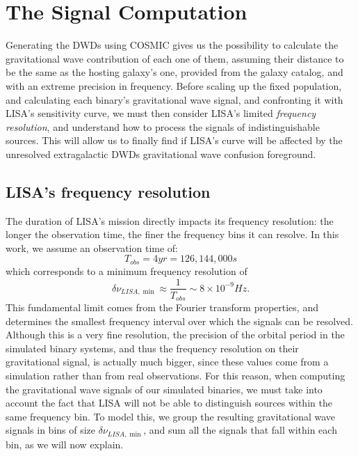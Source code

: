 \section{The Signal Computation}
Generating the DWDs using COSMIC gives us the possibility to calculate the gravitational wave contribution of each one of them, assuming their distance to be the same as the hosting galaxy's one, provided from the galaxy catalog, and with an extreme precision in frequency.
Before scaling up the fixed population, and calculating each binary's gravitational wave signal, and confronting it with LISA's sensitivity curve, we must then consider LISA's limited \textit{frequency resolution}, and understand how to process the signals of indistinguishable sources.
This will allow us to finally find if LISA's curve will be affected by the unresolved extragalactic DWDs gravitational wave confusion foreground.

\subsection{LISA's frequency resolution}
The duration of LISA’s mission directly impacts its frequency resolution: the longer the observation time, the finer the frequency bins it can resolve.
In this work, we assume an observation time of: 
\[
    T_{obs}=4yr=126,144,000s
\]
which corresponds to a minimum frequency resolution of
\begin{equation}
    \delta\nu_{LISA,\min}\approx \frac{1}{T_{obs}}\sim 8\times 10^{-9}Hz.
    \label{eq: LISA frequency resolution}
\end{equation}
This fundamental limit comes from the Fourier transform properties, and determines the smallest frequency interval over which the signals can be resolved.
Although this is a very fine resolution, the precision of the orbital period in the simulated binary systems, and thus the frequency resolution on their gravitational signal, is actually much bigger, since these values come from a simulation rather than from real observations.
For this reason, when computing the gravitational wave signals of our simulated binaries, we must take into account the fact that LISA will not be able to distinguish sources within the same frequency bin.
To model this, we group the resulting gravitational wave signals in bins of size $\delta\nu_{LISA,\min}$, and sum all the signals that fall within each bin, as we will now explain.

